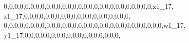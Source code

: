 \documentclass[]{article}
\newenvironment{Shaded}{\begin{snugshade}}{\end{snugshade}}
\newcommand{\DecValTok}[1]{\textcolor[rgb]{0.00,0.00,0.81}{#1}}
\newcommand{\NormalTok}[1]{#1}
\begin{document}
\begin{Shaded}
\begin{Highlighting}[]
\DecValTok{0}\NormalTok{,}\DecValTok{0}\NormalTok{,}\DecValTok{0}\NormalTok{,}\DecValTok{0}\NormalTok{,}\DecValTok{0}\NormalTok{,}\DecValTok{0}\NormalTok{,}\DecValTok{0}\NormalTok{,}\DecValTok{0}\NormalTok{,}\DecValTok{0}\NormalTok{,}\DecValTok{0}\NormalTok{,}\DecValTok{0}\NormalTok{,}\DecValTok{0}\NormalTok{,}\DecValTok{0}\NormalTok{,}\DecValTok{0}\NormalTok{,}\DecValTok{0}\NormalTok{,}\DecValTok{0}\NormalTok{,}\DecValTok{0}\NormalTok{,}\DecValTok{0}\NormalTok{,}\DecValTok{0}\NormalTok{,}\DecValTok{0}\NormalTok{,}\DecValTok{0}\NormalTok{,}\DecValTok{0}\NormalTok{,}\DecValTok{0}\NormalTok{,}\DecValTok{0}\NormalTok{,}\DecValTok{0}\NormalTok{,}\DecValTok{0}\NormalTok{,}\DecValTok{0}\NormalTok{,}\DecValTok{0}\NormalTok{,x1_}\DecValTok{17}\NormalTok{, z1_}\DecValTok{17}\NormalTok{,}\DecValTok{0}\NormalTok{,}\DecValTok{0}\NormalTok{,}\DecValTok{0}\NormalTok{,}\DecValTok{0}\NormalTok{,}\DecValTok{0}\NormalTok{,}\DecValTok{0}\NormalTok{,}\DecValTok{0}\NormalTok{,}\DecValTok{0}\NormalTok{,}\DecValTok{0}\NormalTok{,}\DecValTok{0}\NormalTok{,}\DecValTok{0}\NormalTok{,}\DecValTok{0}\NormalTok{,}\DecValTok{0}\NormalTok{,}\DecValTok{0}\NormalTok{,}\DecValTok{0}\NormalTok{,}\DecValTok{0}\NormalTok{,}\DecValTok{0}\NormalTok{,}\DecValTok{0}\NormalTok{,}\DecValTok{0}\NormalTok{,}\DecValTok{0}\NormalTok{,}
\DecValTok{0}\NormalTok{,}\DecValTok{0}\NormalTok{,}\DecValTok{0}\NormalTok{,}\DecValTok{0}\NormalTok{,}\DecValTok{0}\NormalTok{,}\DecValTok{0}\NormalTok{,}\DecValTok{0}\NormalTok{,}\DecValTok{0}\NormalTok{,}\DecValTok{0}\NormalTok{,}\DecValTok{0}\NormalTok{,}\DecValTok{0}\NormalTok{,}\DecValTok{0}\NormalTok{,}\DecValTok{0}\NormalTok{,}\DecValTok{0}\NormalTok{,}\DecValTok{0}\NormalTok{,}\DecValTok{0}\NormalTok{,}\DecValTok{0}\NormalTok{,}\DecValTok{0}\NormalTok{,}\DecValTok{0}\NormalTok{,}\DecValTok{0}\NormalTok{,}\DecValTok{0}\NormalTok{,}\DecValTok{0}\NormalTok{,}\DecValTok{0}\NormalTok{,}\DecValTok{0}\NormalTok{,}\DecValTok{0}\NormalTok{,}\DecValTok{0}\NormalTok{,}\DecValTok{0}\NormalTok{,}\DecValTok{0}\NormalTok{,}\DecValTok{0}\NormalTok{,}\DecValTok{0}\NormalTok{,w1_}\DecValTok{17}\NormalTok{, y1_}\DecValTok{17}\NormalTok{,}\DecValTok{0}\NormalTok{,}\DecValTok{0}\NormalTok{,}\DecValTok{0}\NormalTok{,}\DecValTok{0}\NormalTok{,}\DecValTok{0}\NormalTok{,}\DecValTok{0}\NormalTok{,}\DecValTok{0}\NormalTok{,}\DecValTok{0}\NormalTok{,}\DecValTok{0}\NormalTok{,}\DecValTok{0}\NormalTok{,}\DecValTok{0}\NormalTok{,}\DecValTok{0}\NormalTok{,}\DecValTok{0}\NormalTok{,}\DecValTok{0}\NormalTok{,}\DecValTok{0}\NormalTok{,}\DecValTok{0}\NormalTok{,}\DecValTok{0}\NormalTok{,}\DecValTok{0}\NormalTok{,}

\end{Highlighting}
\end{Shaded}
\end{document}
